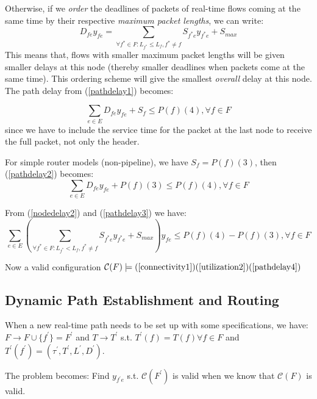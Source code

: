 \documentclass[10pt]{article}
\begin{document}
Otherwise, if we {\em order} the deadlines of packets of real-time flows coming at
the same time by their respective {\em maximum packet lengths}, we can write:
\begin{equation}\label{nodedelay2}
D_{fe}y_{fe} = \sum_{\forall f^{*} \in F: L_{f^{*}} \leq  L_{f}, f^{*}\neq f }S_{f^{*}e}y_{f^{*}e}+S_{max}
\end{equation}
This means that, flows with smaller maximum packet lengths will be given smaller delays
at this node (thereby smaller deadlines when packets come at the same time). This ordering scheme 
will give the smallest {\em overall} delay at this node.
The path delay from (\ref{pathdelay1}) becomes:

\begin{equation}\label{pathdelay2}
\sum_{e \in E}D_{fe}y_{fe} + S_f \leq P(f)(4), \forall f \in F
\end{equation}
since we have to include the service time for the packet at the last node to 
receive the full packet, not only the header.

For simple router models (non-pipeline), we have $S_f = P(f)(3)$, then (\ref{pathdelay2})
becomes:
\begin{equation}\label{pathdelay3}
\sum_{e \in E}D_{fe}y_{fe} + P(f)(3) \leq P(f)(4), \forall f \in F
\end{equation}

From (\ref{nodedelay2}) and (\ref{pathdelay3}) we have:
\begin{equation}\label{pathdelay4}
\sum_{e \in E} (\sum_{\forall f^{*} \in F:L_{f^{*}} < L_{f}, f^{*} \neq f}S_{f^{*}e}y_{f^{*}e}+S_{max})y_{fe} 
\leq P(f)(4)-P(f)(3), \forall f \in F
\end{equation}

Now a valid configuration $\mathcal{C}(F) \models (\ref{connectivity1}) 
(\ref{utilization2}) (\ref{pathdelay4})$

\subsection{Dynamic Path Establishment and Routing}
When a new real-time path needs to be set up with some specifications, we have:
$F \rightarrow F \cup \{f^{'} \}=F^{'}$
and $T \rightarrow T^{'}$ s.t. $T^{'} (f)=T(f)\forall f \in F$ and $T^{'} (f^{'} )=(\tau ^{'}, T^{'}, L^{'}, D^{'})$.

The problem becomes: Find $y_{f^{'}e}$ s.t. $\mathcal{C}(F^{'})$ is valid
when we know that $\mathcal{C}(F)$ is valid.
\end{document}
